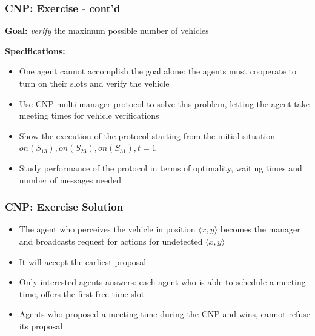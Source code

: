 \begin{frame}
	\frametitle{CNP: Exercise - cont'd}
	
	\large
	
	\vspace{0.3cm}
	
	\textbf{Goal:} \emph{verify} the maximum possible number of vehicles
	
	\vspace{0.3cm}
	
	\textbf{Specifications:}
	
	\begin{itemize}
		\item One agent cannot accomplish the goal alone: the agents must cooperate to turn
			  on their slots and verify the vehicle
		\vspace{0.1cm}
		\item Use CNP multi-manager protocol to solve this problem, letting the agent take
			  meeting times for vehicle verifications
		\vspace{0.1cm}
		\item Show the execution of the protocol starting from the initial situation $
			  on(S_{13}), on(S_{23}), on(S_{31}), t = 1 $
		\vspace{0.1cm}
		\item Study performance of the protocol in terms of optimality, waiting times and
			  number of messages needed
	\end{itemize}
\end{frame}

\begin{frame}
	\frametitle{CNP: Exercise Solution}
	
	\Large
	
	\vspace{0.3cm}
	
	\begin{itemize}
		\item The agent who perceives the vehicle in position $ \langle x,y \rangle $
			  becomes the manager and broadcasts request for actions for undetected $
			  \langle x,y \rangle $
		\vspace{0.1cm}
		\item It will accept the earliest proposal
		\vspace{0.1cm}
		\item Only interested agents answers: each agent who is able to schedule a meeting
			  time, offers the first free time slot
		\vspace{0.1cm}
		\item Agents who proposed a meeting time during the CNP and wins, cannot refuse its
			  proposal
	\end{itemize}
\end{frame}

